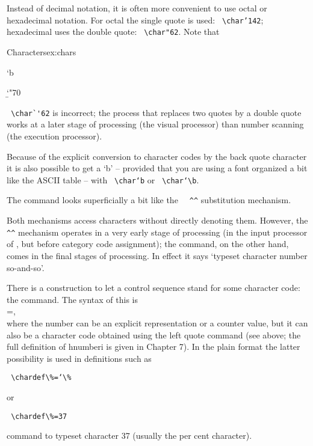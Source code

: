 Instead of decimal notation, it is often more convenient to use octal or hexadecimal notation. For
octal the single quote is used: \verb+ \char’142+; hexadecimal uses the double quote: \verb+ \char"62+. Note that

\begin{texexample}{Characters}{ex:chars}
\bgroup
\ttfamily


\char`b

\char`\b

\char"70

\egroup
\end{texexample}

\verb+ \char`'62+  is incorrect; the process that replaces two quotes by a double quote works at a later
stage of processing (the visual processor) than number scanning (the execution processor).

Because of the explicit conversion to character codes by the back quote character it is also possible
to get a ‘b’ – provided that you are using a font organized a bit like the ASCII table – with \verb+ \char‘b+
or \verb+ \char‘\b+.

The \cmd{\char} command looks superficially a bit like the \verb+  ^^+ substitution mechanism.

Both mechanisms access characters without directly denoting them. However, the \verb+ ^^+ mechanism
operates in a very early stage of processing (in the input processor of \tex, but before category
code assignment); the \cmd{\char} command, on the other hand, comes in the final stages of processing.
In effect it says ‘typeset character number so-and-so’.

\DescribeMacro{\chardef}
There is a construction to let a control sequence stand for some character code: the \cmd{\chardef}
command. The syntax of this is\\
=,\\
where the number can be an explicit representation or a counter value, but it can also be a character
code obtained using the left quote command (see above; the full definition of hnumberi is
given in Chapter 7). In the plain format the latter possibility is used in definitions such as

\verb+ \chardef\%=‘\%+

or 

\verb+ \chardef\%=37   +

command to typeset character 37 (usually the per cent character).

